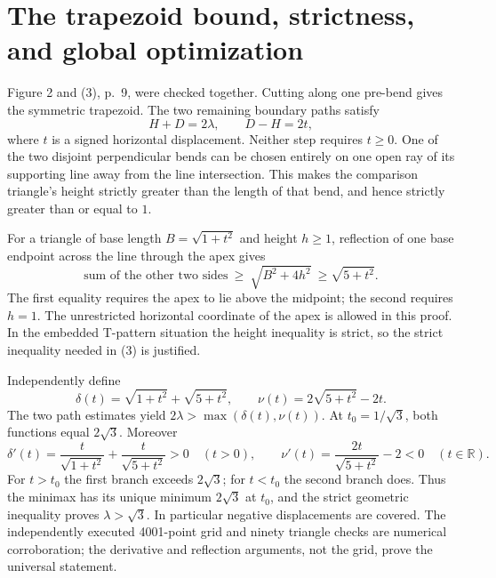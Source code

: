 \documentclass[10pt]{article}
\begin{document}
\section*{The trapezoid bound, strictness, and global optimization}
Figure 2 and (3), p. 9, were checked together. Cutting along one pre-bend gives the symmetric trapezoid. The two remaining boundary paths satisfy \[H+D=2\lambda,\qquad D-H=2t,\] where \(t\) is a signed horizontal displacement. Neither step requires \(t\ge0\). One of the two disjoint perpendicular bends can be chosen entirely on one open ray of its supporting line away from the line intersection. This makes the comparison triangle’s height strictly greater than the length of that bend, and hence strictly greater than or equal to \(1\).\par
For a triangle of base length \(B=\sqrt{1+t^2}\) and height \(h\ge1\), reflection of one base endpoint across the line through the apex gives \[\text{sum of the other two sides}\ \ge\
       \sqrt{B^2+4h^2}\ \ge\sqrt{5+t^2}.
 \tag{R2}\] The first equality requires the apex to lie above the midpoint; the second requires \(h=1\). The unrestricted horizontal coordinate of the apex is allowed in this proof. In the embedded T-pattern situation the height inequality is strict, so the strict inequality needed in (3) is justified.\par
Independently define \[\delta(t)=\sqrt{1+t^2}+\sqrt{5+t^2},\qquad
 \nu(t)=2\sqrt{5+t^2}-2t.\] The two path estimates yield \(2\lambda>\max(\delta(t),\nu(t))\). At \(t_0=1/\sqrt3\), both functions equal \(2\sqrt3\). Moreover \[\delta'(t)=\frac{t}{\sqrt{1+t^2}}+\frac{t}{\sqrt{5+t^2}}>0
       \quad(t>0),\qquad
 \nu'(t)=\frac{2t}{\sqrt{5+t^2}}-2<0
       \quad(t\in\mathbb R).\] For \(t>t_0\) the first branch exceeds \(2\sqrt3\); for \(t<t_0\) the second branch does. Thus the minimax has its unique minimum \(2\sqrt3\) at \(t_0\), and the strict geometric inequality proves \(\lambda>\sqrt3\). In particular negative displacements are covered. The independently executed 4001-point grid and ninety triangle checks are numerical corroboration; the derivative and reflection arguments, not the grid, prove the universal statement.\par
\end{document}
